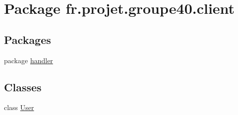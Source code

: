 \hypertarget{namespacefr_1_1projet_1_1groupe40_1_1client}{}\section{Package fr.\+projet.\+groupe40.\+client}
\label{namespacefr_1_1projet_1_1groupe40_1_1client}
\subsection*{Packages}
\begin{DoxyCompactItemize}
\item 
package \hyperlink{namespacefr_1_1projet_1_1groupe40_1_1client_1_1handler}{handler}
\end{DoxyCompactItemize}
\subsection*{Classes}
\begin{DoxyCompactItemize}
\item 
class \hyperlink{classfr_1_1projet_1_1groupe40_1_1client_1_1_user}{User}
\end{DoxyCompactItemize}
